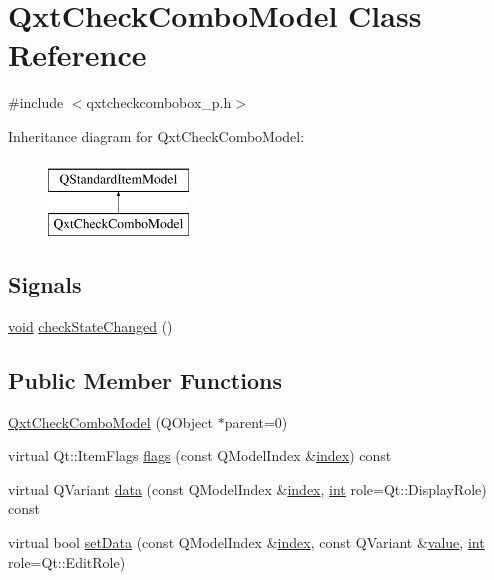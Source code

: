 \hypertarget{class_qxt_check_combo_model}{\section{Qxt\-Check\-Combo\-Model Class Reference}
\label{class_qxt_check_combo_model}
}


{\ttfamily \#include $<$qxtcheckcombobox\-\_\-p.\-h$>$}

Inheritance diagram for Qxt\-Check\-Combo\-Model\-:\begin{figure}[H]
\begin{center}
\leavevmode
\includegraphics[height=2.000000cm]{class_qxt_check_combo_model}
\end{center}
\end{figure}
\subsection*{Signals}
\begin{DoxyCompactItemize}
\item 
\hyperlink{group___u_a_v_objects_plugin_ga444cf2ff3f0ecbe028adce838d373f5c}{void} \hyperlink{class_qxt_check_combo_model_a43b4ef130e2023936ae6afddf7d41867}{check\-State\-Changed} ()
\end{DoxyCompactItemize}
\subsection*{Public Member Functions}
\begin{DoxyCompactItemize}
\item 
\hyperlink{class_qxt_check_combo_model_aef7f7923e2055c8e6ac09b41d7410f0f}{Qxt\-Check\-Combo\-Model} (Q\-Object $\ast$parent=0)
\item 
virtual Qt\-::\-Item\-Flags \hyperlink{class_qxt_check_combo_model_a3c29ae9c2396beb7cc500974f5584274}{flags} (const Q\-Model\-Index \&\hyperlink{glext_8h_ab47dd9958bcadea08866b42bf358e95e}{index}) const 
\item 
virtual Q\-Variant \hyperlink{class_qxt_check_combo_model_a08ebf75da9c5693830468b3ddf0fa93a}{data} (const Q\-Model\-Index \&\hyperlink{glext_8h_ab47dd9958bcadea08866b42bf358e95e}{index}, \hyperlink{ioapi_8h_a787fa3cf048117ba7123753c1e74fcd6}{int} role=Qt\-::\-Display\-Role) const 
\item 
virtual bool \hyperlink{class_qxt_check_combo_model_a4c05997c6420ca848bab092c33a1e967}{set\-Data} (const Q\-Model\-Index \&\hyperlink{glext_8h_ab47dd9958bcadea08866b42bf358e95e}{index}, const Q\-Variant \&\hyperlink{glext_8h_aa0e2e9cea7f208d28acda0480144beb0}{value}, \hyperlink{ioapi_8h_a787fa3cf048117ba7123753c1e74fcd6}{int} role=Qt\-::\-Edit\-Role)
\end{DoxyCompactItemize}


